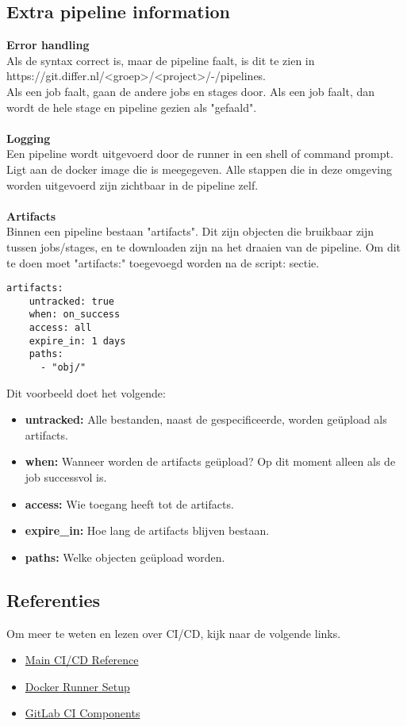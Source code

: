 \documentclass{article}
\begin{document}
\newpage

\subsection{Extra pipeline information}

\textbf{Error handling}
\\
Als de syntax correct is, maar de pipeline faalt, is dit te zien in \\  
https://git.differ.nl/<groep>/<project>/-/pipelines. \\
Als een job faalt, gaan de andere jobs en stages door. Als een job faalt, dan wordt de hele stage en pipeline gezien als "gefaald".
\\
\\
\textbf{Logging}
\\
Een pipeline wordt uitgevoerd door de runner in een shell of command prompt. Ligt aan de docker image die is meegegeven. Alle stappen die in deze omgeving worden uitgevoerd zijn zichtbaar in de pipeline zelf. 
\\
\\
\textbf{Artifacts}
\\
Binnen een pipeline bestaan "artifacts". Dit zijn objecten die bruikbaar zijn tussen jobs/stages, en te downloaden zijn na het draaien van de pipeline. Om dit te doen moet "artifacts:" toegevoegd worden na de script: sectie. 

\begin{lstlisting}[style=yaml]
    artifacts:
    untracked: true
    when: on_success
    access: all
    expire_in: 1 days
    paths:
      - "obj/"
\end{lstlisting}

Dit voorbeeld doet het volgende:
\begin{itemize}
    \item {\textbf{untracked:}} Alle bestanden, naast de gespecificeerde, worden geüpload als artifacts.
    \item  {\textbf{when:}} Wanneer worden de artifacts geüpload? Op dit moment alleen als de job successvol is.
    \item {\textbf{access:}} Wie toegang heeft tot de artifacts.
    \item {\textbf{expire\_in:}} Hoe lang de artifacts blijven bestaan.
    \item {\textbf{paths:}} Welke objecten geüpload worden. 
\end{itemize}

\subsection{Referenties}

Om meer te weten en lezen over CI/CD, kijk naar de volgende links. 

\begin{itemize}
  \item \href{https://docs.gitlab.com/topics/build_your_application/}{Main CI/CD Reference}
  \item \href{https://docs.gitlab.com/runner/install/docker/}{Docker Runner Setup}
  \item \href{https://docs.gitlab.com/ci/components/}{GitLab CI Components}
\end{itemize}
\end{document}

